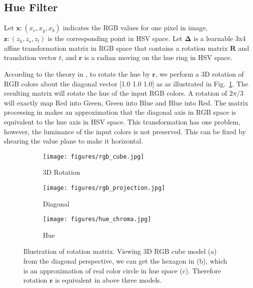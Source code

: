 \documentclass[runningheads]{llncs}
\begin{document}
   \subsection{Hue Filter}
   \label{color filter}
   Let $\bm{x}:(x_r,x_g,x_b)$ indicates the RGB values for one pixel in image, $\bm{z}:(z_h,z_s,z_l)$ is the corresponding point in HSV space. Let $\bm{\Delta}$ is a learnable 3x4 affine transformation matrix in RGB space that contains a rotation matrix $\bm{R}$ and translation vector $t$, and $\bm{r}$ is a radian moving on the hue ring in HSV space.
   
   According to the theory in \cite{haeberli1993matrix}, to rotate the hue by $\bm{r}$, we perform a 3D rotation of RGB colors about the diagonal vector [1.0 1.0 1.0] as as illustrated in Fig.~\ref{fig:rotation}.
   The resulting matrix will rotate the hue of the input RGB colors. A rotation of $2\pi/3$ will exactly map Red into Green, Green into Blue and Blue into Red.
   The matrix processing in \cite{haeberli1993matrix} makes an approximation that the diagonal axis in RGB space is equivalent to the hue axis in HSV space.
   This transformation has one problem, however, the luminance of the input colors is not preserved. 
   This can be fixed by shearing the value plane to make it horizontal.
   
   


   
   
   \begin{figure}[htbp]
   \centering
   
   \begin{subfigure}[t]{0.3\linewidth}
   \centering
   \texttt{[image: figures/rgb\_cube.jpg]}
   \caption{3D Rotation}
   \end{subfigure}
   \begin{subfigure}[t]{0.23\linewidth}
   \centering
   \texttt{[image: figures/rgb\_projection.jpg]}
   \caption{Diagonal}
   \end{subfigure}
   \begin{subfigure}[t]{0.25\linewidth}
   \centering
   \texttt{[image: figures/hue\_chroma.jpg]}
   \caption{Hue}
   \end{subfigure}
   
   \caption{Illustration of rotation matrix. Viewing 3D RGB cube model (a) from the diagonal perspective, we can get the hexagon in (b), which is an approximation of real color circle in hue space (c).
   Therefore rotation $\bm{r}$ is equivalent in above three models.
   }
   \label{fig:rotation}
   \end{figure}
   
\end{document}
